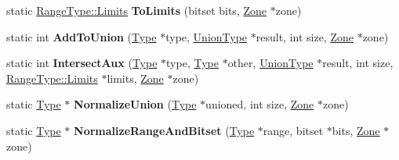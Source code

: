 \begin{DoxyCompactItemize}
\item 
static \hyperlink{structv8_1_1internal_1_1_range_type_1_1_limits}{Range\+Type\+::\+Limits} {\bfseries To\+Limits} (bitset bits, \hyperlink{classv8_1_1internal_1_1_zone}{Zone} $\ast$zone)\hypertarget{classv8_1_1internal_1_1_type_ac74be6e2d9f1389377637cbdeb249be8}{}\label{classv8_1_1internal_1_1_type_ac74be6e2d9f1389377637cbdeb249be8}

\item 
static int {\bfseries Add\+To\+Union} (\hyperlink{classv8_1_1internal_1_1_type}{Type} $\ast$type, \hyperlink{classv8_1_1internal_1_1_union_type}{Union\+Type} $\ast$result, int size, \hyperlink{classv8_1_1internal_1_1_zone}{Zone} $\ast$zone)\hypertarget{classv8_1_1internal_1_1_type_a9d4ab8069ac4b59016fa7b99e3eb3081}{}\label{classv8_1_1internal_1_1_type_a9d4ab8069ac4b59016fa7b99e3eb3081}

\item 
static int {\bfseries Intersect\+Aux} (\hyperlink{classv8_1_1internal_1_1_type}{Type} $\ast$type, \hyperlink{classv8_1_1internal_1_1_type}{Type} $\ast$other, \hyperlink{classv8_1_1internal_1_1_union_type}{Union\+Type} $\ast$result, int size, \hyperlink{structv8_1_1internal_1_1_range_type_1_1_limits}{Range\+Type\+::\+Limits} $\ast$limits, \hyperlink{classv8_1_1internal_1_1_zone}{Zone} $\ast$zone)\hypertarget{classv8_1_1internal_1_1_type_a67fbe2d813cc3523bbda04a048bedb17}{}\label{classv8_1_1internal_1_1_type_a67fbe2d813cc3523bbda04a048bedb17}

\item 
static \hyperlink{classv8_1_1internal_1_1_type}{Type} $\ast$ {\bfseries Normalize\+Union} (\hyperlink{classv8_1_1internal_1_1_type}{Type} $\ast$unioned, int size, \hyperlink{classv8_1_1internal_1_1_zone}{Zone} $\ast$zone)\hypertarget{classv8_1_1internal_1_1_type_a3252d8cee588b14b3438f2c4c0e560f9}{}\label{classv8_1_1internal_1_1_type_a3252d8cee588b14b3438f2c4c0e560f9}

\item 
static \hyperlink{classv8_1_1internal_1_1_type}{Type} $\ast$ {\bfseries Normalize\+Range\+And\+Bitset} (\hyperlink{classv8_1_1internal_1_1_type}{Type} $\ast$range, bitset $\ast$bits, \hyperlink{classv8_1_1internal_1_1_zone}{Zone} $\ast$zone)\hypertarget{classv8_1_1internal_1_1_type_a01f4d425514a65cb88973fd552e76bbc}{}\label{classv8_1_1internal_1_1_type_a01f4d425514a65cb88973fd552e76bbc}

\end{DoxyCompactItemize}
